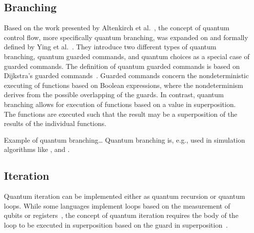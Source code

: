 \subsection{Branching}
Based on the work presented by Altenkirch et al.~\cite{AlGr05}, the concept of quantum control flow, more specifically quantum branching, was expanded on and formally defined by Ying et al.~\cite{YYF12}. They introduce two different types of quantum branching, quantum guarded commands, and quantum choices as a special case of guarded commands. The definition of quantum guarded commands is based on Dijkstra's guarded commands~\cite{Dijk75}. Guarded commands concern the nondeterministic executing of functions based on Boolean expressions, where the nondeterminism derives from the possible overlapping of the guards. In contrast, quantum branching allows for execution of functions based on a value in superposition. The functions are executed such that the result may be a superposition of the results of the individual functions.


Example of quantum branching\dots
Quantum branching is, e.g., used in simulation algorithms like \cite{BGB*18}, and \cite{LoCh19}.

\subsection{Iteration}
Quantum iteration can be implemented either as quantum recursion or quantum loops. While some languages implement loops based on the measurement of qubits or registers~\cite{Ying11}, the concept of quantum iteration requires the body of the loop to be executed in superposition based on the guard in superposition~\cite{YYF12}.

